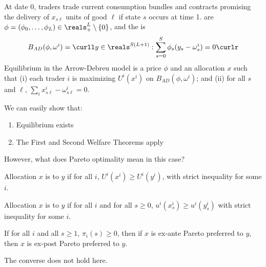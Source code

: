 \documentclass[10pt]{article}
\begin{document}
\begin{model}
	 At date 0, traders trade current consumption bundles and contracts promising the delivery of $x_{s\ell}$ units of good $\ell$ if state $s$ occurs at time 1.  are $\phi = (\phi_0,\dots,\phi_L) \in \reals^{L}_+ \setminus \{0\}$, and the  is\[B_{AD}(\phi,\omega^i) = \curll y \in \reals^{S(L+1)} : \sum_{s=0}^S \phi_s(y_s-\omega_s^i) = 0\curlr\]Equilibrium in the Arrow-Debreu model is a price $\phi$ and an allocation $x$ such that (i) each trader $i$ is maximizing $U^i(x^i)$ on $B_{AD}(\phi,\omega^i)$; and (ii) for all $s$ and $\ell$, $\sum_i x^i_{s\ell} - \omega^i_{s\ell} = 0$. 
	
	We can easily show that:
	\begin{enumerate}
		\item Equilibrium exists
		\item The First and Second Welfare Theorems apply
	\end{enumerate}
	However, what does Pareto optimality mean in this case?
	\begin{definition}
		Allocation $x$ is  to $y$ if for all $i$, $U^i(x^i) \ge U^i(y^i)$, with strict inequality for some $i$.
		
		Allocation $x$ is  to $y$ if for all $i$ and for all $s \ge 0$, $u^i(x^i_s) \ge u^i(y^i_s)$ with strict inequality for some $i$.
	\end{definition}
	
	\begin{theorem}
		If for all $i$ and all $s \ge 1$, $\pi_i(s) \ge 0$, then if $x$ is ex-ante Pareto preferred to $y$, then $x$ is ex-post Pareto preferred to $y$.
	\end{theorem}
	\begin{remark}
		The converse does not hold here.
	\end{remark}
\end{model}
\end{document}
